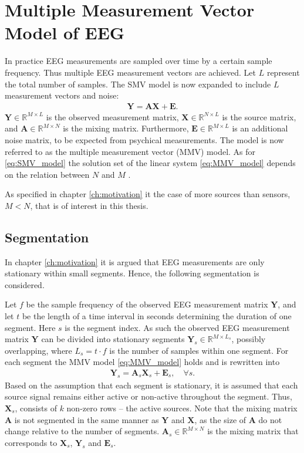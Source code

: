 \section{Multiple Measurement Vector Model of EEG}\label{sec:MMV}
In practice EEG measurements are sampled over time by a certain sample frequency. 
Thus multiple EEG measurement vectors are achieved.
Let $L$ represent the total number of samples. 
The SMV model is now expanded to include $L$ measurement vectors and noise:
\begin{align}\label{eq:MMV_model}
\mathbf{Y} = \mathbf{AX}+\textbf{E}.
\end{align}
$\mathbf{Y} \in \mathbb{R}^{M \times L}$ is the observed measurement matrix, $\mathbf{X} \in \mathbb{R}^{N \times L}$ is the source matrix, and $\mathbf{A} \in \mathbb{R}^{M \times N}$ is the mixing matrix. 
Furthermore, $\mathbf{E} \in \mathbb{R}^{M \times L}$ is an additional noise matrix, to be expected from psychical measurements.  
The model is now referred to as the multiple measurement vector (MMV) model.
As for \eqref{eq:SMV_model} the solution set of the linear system \eqref{eq:MMV_model} depends on the relation between $N$ and $M$ \cite[p. 42]{CS}. 

As specified in chapter \ref{ch:motivation} it the case of more sources than sensors, $M<N$, that is of interest in this thesis.  

\subsection{Segmentation}\label{seg_segmentation}
In chapter \ref{ch:motivation} it is argued that EEG measurements are only stationary within small segments. 
Hence, the following segmentation is considered.

Let $f$ be the sample frequency of the observed EEG measurement matrix $\mathbf{Y}$, and let $t$ be the length of a time interval in seconds determining the duration of one segment. 
Here $s$ is the segment index. 
As such the observed EEG measurement matrix $\mathbf{Y}$ can be divided into stationary segments $\mathbf{Y}_s \in \mathbb{R}^{M \times L_{s}}$, possibly overlapping, where $L_s = t \cdot f$ is the number of samples within one segment. 
For each segment the MMV model \eqref{eq:MMV_model} holds and is rewritten into
\begin{align}\label{eq:MMV_seg}
\mathbf{Y}_s = \textbf{A}_s\mathbf{X}_s + \textbf{E}_s, \quad \forall s.
\end{align}
Based on the assumption that each segment is stationary, it is assumed that each source signal remains either active or non-active throughout the segment.
Thus, $\mathbf{X}_s$, consists of $k$ non-zero rows -- the active sources.
Note that the mixing matrix $\textbf{A}$ is not segmented in the same manner as $\textbf{Y}$ and $\textbf{X}$, as the size of $\textbf{A}$ do not change relative to the number of segments. $\textbf{A}_s\in \mathbb{R}^{M\times N}$ is the mixing matrix that corresponds to $\textbf{X}_s$, $\textbf{Y}_s$ and $\textbf{E}_s$.

